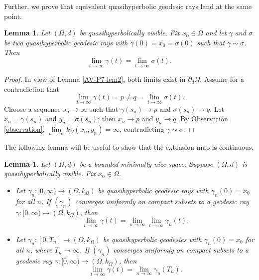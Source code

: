\documentclass[a4paper,12pt]{amsart}
\newtheorem{lem}[equation]{Lemma}
\theoremstyle{definition}
\begin{document}
Further, we prove that equivalent quasihyperbolic geodesic rays land at the same point.

\begin{lem}\label{AV-P7-lem3}
	Let $(\Omega,d)$ be quasihyperbolically visible. Fix $x_0\in \Omega$ and let $\gamma$ and $\sigma$ be two quasihyperbolic geodesic rays with $\gamma(0)=x_0=\sigma(0)$ such that $\gamma \sim \sigma$. Then
	\[
	\lim_{t\to \infty}\gamma(t)=\lim_{t\to \infty} \sigma(t).
	\]
\end{lem}

\begin{proof}
	In view of Lemma \ref{AV-P7-lem2}, both limits exist in $\partial_d\Omega$.
	Assume for a contradiction that
	\[
	\lim_{t\to \infty}\gamma(t)=p\neq q=\lim_{t\to \infty} \sigma(t).
	\]
	Choose a sequence $s_n\to \infty$ such that $\gamma(s_n)\to p$ and $\sigma(s_n)\to q$.
	Let $x_n=\gamma(s_n)$ and $y_n=\sigma(s_n)$; then $x_n\to p$ and $y_n\to q$.
	By Observation \ref{observation}, $\lim\limits_{n \to \infty}k_{\Omega}(x_n,y_n)=\infty$, contradicting $\gamma\sim \sigma$.
\end{proof}

The following lemma will be useful to show that the extension map is continuous.

\begin{lem}\label{continuous}
	Let $(\Omega,d)$ be a bounded minimally nice space. Suppose $(\Omega,d)$ is quasihyperbolically visible. Fix $x_0\in \Omega$.
	\begin{itemize}
		\item[(i)] Let $\gamma_n:[0,\infty)\to (\Omega,k_{\Omega})$ be quasihyperbolic geodesic rays with $\gamma_n(0)=x_0$ for all $n$.
		If $(\gamma_n)$ converges uniformly on compact subsets to a geodesic ray $\gamma:[0,\infty)\to (\Omega,k_{\Omega})$, then
		\[
		\lim_{t\to \infty}\gamma(t)=\lim_{n\to \infty}\lim_{t\to\infty}\gamma_n(t).
		\]
		\item[(ii)] Let $\gamma_n:[0,T_n]\to (\Omega,k_{\Omega})$ be quasihyperbolic geodesics with $\gamma_n(0)=x_0$ for all $n$, where $T_n\to\infty$.
		If $(\gamma_n)$ converges uniformly on compact subsets to a geodesic ray $\gamma:[0,\infty)\to (\Omega,k_{\Omega})$, then
		\[
		\lim_{t\to \infty}\gamma(t)=\lim_{n\to \infty}\gamma_n(T_n).
		\]
	\end{itemize}
\end{lem}
\end{document}
